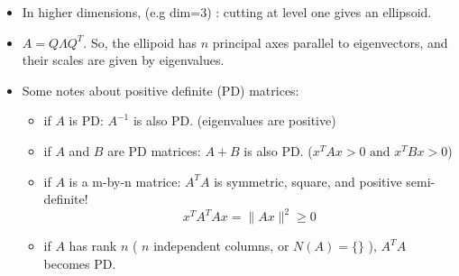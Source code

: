 \documentclass[a4paper,12pt]{article}
\theoremstyle{definition} \newtheorem{Theorem}{Theorem}
\begin{document}
\begin{itemize}
\item In higher dimensions, (e.g dim=3) : cutting at level one gives an ellipsoid.
\item $A = Q \Lambda Q^T$. So, the ellipoid has $n$ principal axes parallel to eigenvectors, and their scales
 are given by eigenvalues.
\item Some notes about positive definite (PD) matrices: 
\begin{itemize}
\item if $A$ is PD: $A^{-1}$ is also PD. (eigenvalues are positive)
\item if $A$ and $B$ are PD matrices: $A+B$ is also PD. ($x^T A x > 0\text{ and } x^T B x > 0$)
\item if $A$ is a m-by-n matrice: $A^T A$ is symmetric, square, and positive semi-definite! 
\begin{equation*}
x^T A^T A x = \lVert Ax \rVert^2 \geq 0
\end{equation*}

\item if $A$ has rank $n$ ( $n$ independent columns, or $N(A)=\{\}$ ), $A^T A$ becomes PD.
\end{itemize}
\end{itemize}
\end{document}
